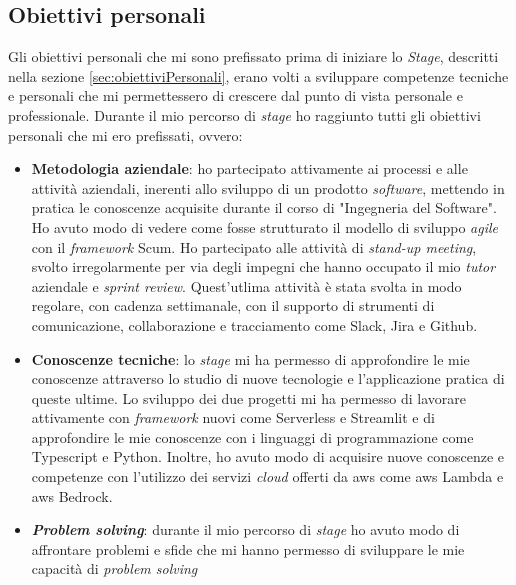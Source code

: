 \subsection{Obiettivi personali}
Gli obiettivi personali che mi sono prefissato prima di iniziare lo \textit{Stage}, descritti nella sezione \ref{sec:obiettiviPersonali}, erano volti a sviluppare competenze tecniche e personali che mi permettessero di crescere dal punto di vista personale e professionale.
Durante il mio percorso di \textit{stage} ho raggiunto tutti gli obiettivi personali che mi ero prefissati, ovvero:
\begin{itemize}
    \item \textbf{Metodologia aziendale}: ho partecipato attivamente ai processi e alle attività aziendali, inerenti allo sviluppo di un prodotto \textit{software}, mettendo in pratica le conoscenze acquisite durante il corso di "Ingegneria del Software". Ho avuto modo di vedere come fosse strutturato il modello di sviluppo \textit{agile} con il \textit{framework} Scum. Ho partecipato alle attività di \textit{stand-up meeting}, svolto irregolarmente per via degli impegni che hanno occupato il mio \textit{tutor} aziendale e \textit{sprint review}. Quest'utlima attività è stata svolta in modo regolare, con cadenza settimanale, con il supporto di strumenti di comunicazione, collaborazione e tracciamento come Slack, Jira e Github. 
    \item \textbf{Conoscenze tecniche}: lo \textit{stage} mi ha permesso di approfondire le mie conoscenze attraverso lo studio di nuove tecnologie e l'applicazione pratica di queste ultime. Lo sviluppo dei due progetti mi ha permesso di lavorare attivamente con \textit{framework} nuovi come Serverless e Streamlit e di approfondire le mie conoscenze con i linguaggi di programmazione come Typescript e Python. Inoltre, ho avuto modo di acquisire nuove conoscenze e competenze con l'utilizzo dei servizi \textit{cloud} offerti da \gls{aws} come \gls{aws} Lambda e \gls{aws} Bedrock.
    \item \textbf{\textit{Problem solving}}: durante il mio percorso di \textit{stage} ho avuto modo di affrontare problemi e sfide che mi hanno permesso di sviluppare le mie capacità di \textit{problem solving}
\end{itemize}

